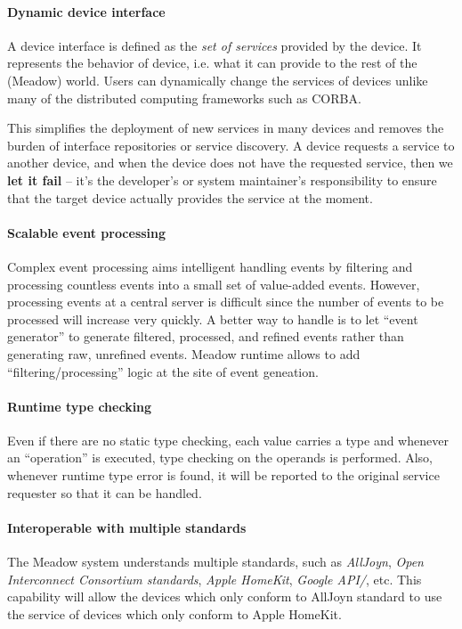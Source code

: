 \documentclass{note}
\begin{document}
\paragraph{Dynamic device interface}
A device interface is defined as the {\em set of services\/}
provided by the device.
It represents the behavior of device, i.e. what it can provide to the rest of
the (Meadow) world. Users can dynamically change the services of devices
unlike many of the distributed computing frameworks such as CORBA. 

This
simplifies the deployment of new services in many devices and removes
the burden of interface repositories or service discovery. 
A device requests a service to another device, and when the device does not
have the requested service, then we \textcolor{blue2}{\bf{}let it fail} --
it's the developer's or system maintainer's responsibility to ensure that the
target device actually provides the service at the moment. 

\paragraph{Scalable event processing}
Complex event processing aims intelligent handling events by filtering and
processing countless events into a small set of value-added events.
However, processing events at a central server is difficult since the number
of events to be processed will increase very quickly. A better way to handle
is to let ``event generator'' to generate filtered, processed, and refined
events rather than generating raw, unrefined events. Meadow runtime allows to
add ``filtering/processing'' logic at the site of event geneation.

\paragraph{Runtime type checking}
Even if there are no static type checking, each value carries a type and
whenever an ``operation'' is executed, type checking on the operands is
performed. Also, whenever runtime type error is found, it will be reported to
the original service requester so that it can be handled.


\paragraph{Interoperable with multiple standards}
The Meadow system understands multiple standards, such as 
{\em AllJoyn\/}, {\em Open Interconnect
Consortium standards\/},  {\em Apple HomeKit\/}, {\em Google API/}, etc.
This capability will allow the devices which only conform to AllJoyn standard
to use the service of devices which only conform to Apple HomeKit. 
\end{document}
